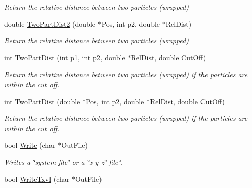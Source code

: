 \begin{DoxyCompactItemize}
\begin{DoxyCompactList}\small\item\em \-Return the relative distance between two particles (wrapped) \end{DoxyCompactList}\item 
\hypertarget{classVarData_ac18654b4b07d2480609388a671319d76}{double \hyperlink{classVarData_ac18654b4b07d2480609388a671319d76}{\-Two\-Part\-Dist2} (double $\ast$\-Pos, int p2, double $\ast$\-Rel\-Dist)}\label{classVarData_ac18654b4b07d2480609388a671319d76}

\begin{DoxyCompactList}\small\item\em \-Return the relative distance between two particles (wrapped) \end{DoxyCompactList}\item 
\hypertarget{classVarData_a72b2b49ea5c00c2902e419ff8ec9a095}{int \hyperlink{classVarData_a72b2b49ea5c00c2902e419ff8ec9a095}{\-Two\-Part\-Dist} (int p1, int p2, double $\ast$\-Rel\-Dist, double \-Cut\-Off)}\label{classVarData_a72b2b49ea5c00c2902e419ff8ec9a095}

\begin{DoxyCompactList}\small\item\em \-Return the relative distance between two particles (wrapped) if the particles are within the cut off. \end{DoxyCompactList}\item 
\hypertarget{classVarData_a7ecd9d43c45ae675e71f9b926673c8e4}{int \hyperlink{classVarData_a7ecd9d43c45ae675e71f9b926673c8e4}{\-Two\-Part\-Dist} (double $\ast$\-Pos, int p2, double $\ast$\-Rel\-Dist, double \-Cut\-Off)}\label{classVarData_a7ecd9d43c45ae675e71f9b926673c8e4}

\begin{DoxyCompactList}\small\item\em \-Return the relative distance between two particles (wrapped) if the particles are within the cut off. \end{DoxyCompactList}\item 
\hypertarget{classVarData_a054aab836dcf7735720ef32e0b8f7ecb}{bool \hyperlink{classVarData_a054aab836dcf7735720ef32e0b8f7ecb}{\-Write} (char $\ast$\-Out\-File)}\label{classVarData_a054aab836dcf7735720ef32e0b8f7ecb}

\begin{DoxyCompactList}\small\item\em \-Writes a \char`\"{}system-\/file\char`\"{} or a \char`\"{}x y z\char`\"{} file". \end{DoxyCompactList}\item 
\hypertarget{classVarData_a76873542f36c8e36b790c90273c95cf1}{bool \hyperlink{classVarData_a76873542f36c8e36b790c90273c95cf1}{\-Write\-Txvl} (char $\ast$\-Out\-File)}\label{classVarData_a76873542f36c8e36b790c90273c95cf1}


\end{DoxyCompactItemize}
